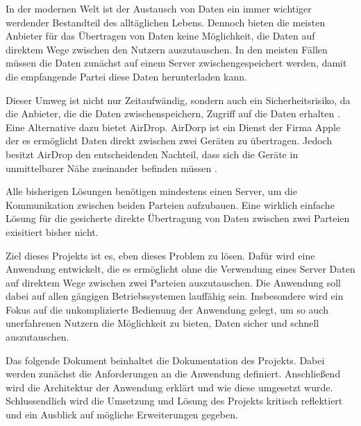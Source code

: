 In der modernen Welt ist der Austausch von Daten ein immer wichtiger werdender Bestandteil des alltäglichen Lebens. Dennoch bieten die meisten Anbieter für das Übertragen von Daten keine Möglichkeit, die Daten auf direktem Wege zwischen den Nutzern auszutauschen. In den meisten Fällen müssen die Daten zunächst auf einem Server zwischengespeichert werden, damit die empfangende Partei diese Daten herunterladen kann.

Dieser Umweg ist nicht nur Zeitaufwändig, sondern auch ein Sicherheitsrisiko, da die Anbieter, die die Daten zwischenspeichern, Zugriff auf die Daten erhalten \cite{bsi-cloud}. Eine Alternative dazu bietet AirDrop. AirDorp ist ein Dienst der Firma Apple der es ermöglicht Daten direkt zwischen zwei Geräten zu übertragen. Jedoch besitzt AirDrop den entscheidenden Nachteil, dass sich die Geräte in unmittelbarer Nähe zueinander befinden müssen \cite{apple-airdrop}.

Alle bisherigen Lösungen benötigen mindestens einen Server, um die Kommunikation zwischen beiden Parteien aufzubauen. Eine wirklich einfache Lösung für die gesicherte direkte Übertragung von Daten zwischen zwei Parteien exisitiert bisher nicht.

Ziel dieses Projekts ist es, eben dieses Problem zu lösen. Dafür wird eine Anwendung entwickelt, die es ermöglicht ohne die Verwendung eines Server Daten auf direktem Wege zwischen zwei Parteien auszutauschen. Die Anwendung soll dabei auf allen gängigen Betriebssystemen lauffähig sein. Insbesondere wird ein Fokus auf die unkomplizierte Bedienung der Anwendung gelegt, um so auch unerfahrenen Nutzern die Möglichkeit zu bieten, Daten sicher und schnell auszutauschen.

Das folgende Dokument beinhaltet die Dokumentation des Projekts. Dabei werden zunächst die Anforderungen an die Anwendung definiert. Anschließend wird die Architektur der Anwendung erklärt und wie diese umgesetzt wurde. Schlussendlich wird die Umsetzung und Lösung des Projekts kritisch reflektiert und ein Ausblick auf mögliche Erweiterungen gegeben.